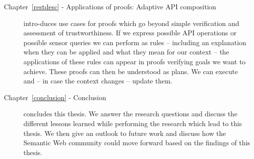 \begin{description}
\item[Chapter~\ref{restdesc} - Applications of proofs: Adaptive API composition]
intro-\linebreak duces use cases for proofs which go 
beyond simple verification and assessment of trustworthiness.
If we express possible API operations or possible sensor queries we can perform as rules -- including an explanation when they can be applied and what they mean 
for our context -- the applications of these rules can appear in proofs verifying goals we want to achieve. These proofs can then be understood as plans. 
We can execute and -- in case the context changes -- update them. 
% 
% 


\item[Chapter~\ref{conclusion} - Conclusion]
concludes this thesis.  We answer the research questions and discuss the different lessons learned while performing the research which  lead to this thesis.
We then give an outlook to future work and discuss how the Semantic Web community could move forward based on the findings of this thesis.
% 



\end{description}
